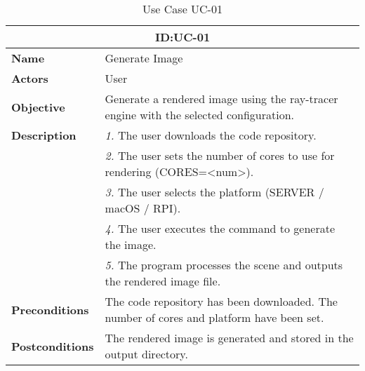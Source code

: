 \begin{table}[H]
    \centering
    \begin{tabular}{l p{10cm}}
        \toprule
        \multicolumn{2}{c}{\textbf{ID:\@ UC-01}} \\
        \toprule
        \textbf{Name}               &  Generate Image \\
        \textbf{Actors}             &  User \\
        \textbf{Objective}          &  Generate a rendered image using the ray-tracer engine with the selected configuration. \\
        \textbf{Description}        & \textsl{1.} The user downloads the code repository. \\
                                   & \textsl{2.} The user sets the number of cores to use for rendering (CORES=<num>). \\
                                   & \textsl{3.} The user selects the platform (SERVER / macOS / RPI). \\
                                   & \textsl{4.} The user executes the command to generate the image. \\
                                   & \textsl{5.} The program processes the scene and outputs the rendered image file. \\
        \textbf{Preconditions}      &  The code repository has been downloaded. The number of cores and platform have been set. \\
        \textbf{Postconditions}     &  The rendered image is generated and stored in the output directory. \\
    \end{tabular}
    \caption{Use Case UC-01}\label{tab:uc-01}
\end{table}


